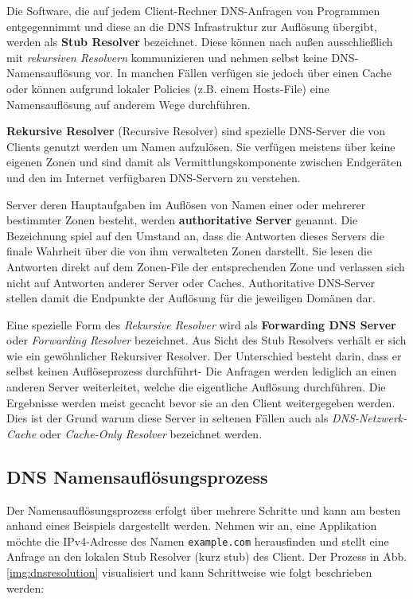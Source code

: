 Die Software, die auf jedem Client-Rechner DNS-Anfragen von Programmen entgegennimmt und diese an die DNS Infrastruktur zur Auflösung übergibt, werden als \textbf{Stub Resolver} bezeichnet. Diese können nach außen ausschließlich mit \textit{rekursiven Resolvern} kommunizieren und nehmen selbst keine DNS-Namensauflösung vor. In manchen Fällen verfügen sie jedoch über einen Cache oder können aufgrund lokaler Policies (z.B. einem Hosts-File) eine Namensauflösung auf anderem Wege durchführen.

\textbf{Rekursive Resolver} (Recursive Resolver) sind spezielle DNS-Server die von Clients genutzt werden um Namen aufzulösen. Sie verfügen meistens über keine eigenen Zonen und sind damit als Vermittlungskomponente zwischen Endgeräten und den im Internet verfügbaren DNS-Servern zu verstehen.

Server deren Hauptaufgaben im Auflösen von Namen einer oder mehrerer bestimmter Zonen besteht, werden \textbf{authoritative Server} genannt. Die Bezeichnung spiel auf den Umstand an, dass die Antworten dieses Servers die finale Wahrheit über die von ihm verwalteten Zonen darstellt. Sie lesen die Antworten direkt auf dem Zonen-File der entsprechenden Zone und verlassen sich nicht auf Antworten anderer Server oder Caches. Authoritative DNS-Server stellen damit die Endpunkte der Auflösung für die jeweiligen Domänen dar.

Eine spezielle Form des \textit{Rekursive Resolver} wird als \textbf{Forwarding DNS Server} oder \textit{Forwarding Resolver} bezeichnet. Aus Sicht des Stub Resolvers verhält er sich wie ein gewöhnlicher Rekursiver Resolver. Der Unterschied besteht darin, dass er selbst keinen Auflöseprozess durchführt- Die Anfragen werden lediglich an einen anderen Server weiterleitet, welche die eigentliche Auflösung durchführen. Die Ergebnisse werden meist gecacht bevor sie an den Client weitergegeben werden. Dies ist der Grund warum diese Server in seltenen Fällen auch als \textit{DNS-Netzwerk-Cache} oder \textit{Cache-Only Resolver} bezeichnet werden. 

\subsection{DNS Namensauflösungsprozess}
\label{subsec:dnsresolution}

Der Namensauflösungsprozess erfolgt über mehrere Schritte und kann am besten anhand eines Beispiels dargestellt werden. Nehmen wir an, eine Applikation möchte die IPv4-Adresse des Namen \texttt{example.com} herausfinden und stellt eine Anfrage an den lokalen Stub Resolver (kurz stub) des Client. Der Prozess in Abb. \ref{img:dnsresolution} visualisiert und kann Schrittweise wie folgt beschrieben werden:

